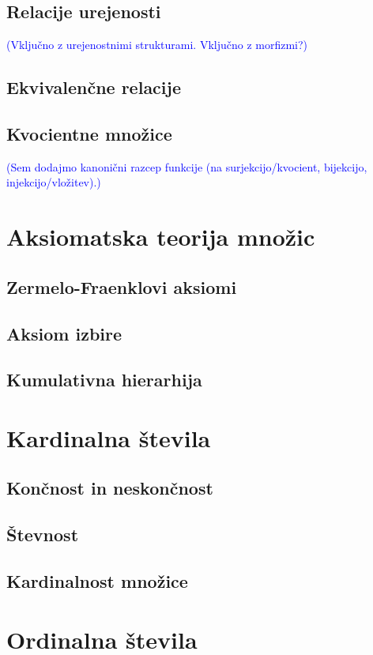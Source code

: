 \documentclass[11pt,a4paper,twoside]{book}
\newcommand{\note}[1]{{\small\textcolor{blue}{(#1)}}}
\begin{document}
		\section{Relacije urejenosti}
			\note{Vključno z urejenostnimi strukturami. Vključno z morfizmi?}
		\section{Ekvivalenčne relacije}
		\section{Kvocientne množice}
			\note{Sem dodajmo kanonični razcep funkcije (na surjekcijo/kvocient, bijekcijo, injekcijo/vložitev).}
	
	\chapter{Aksiomatska teorija množic}
		\section{Zermelo-Fraenklovi aksiomi}
		\section{Aksiom izbire}
		\section{Kumulativna hierarhija}
	
	\chapter{Kardinalna števila}
		\section{Končnost in neskončnost}
		\section{Števnost}
		\section{Kardinalnost množice}
	
	\chapter{Ordinalna števila}
	
\end{document}
